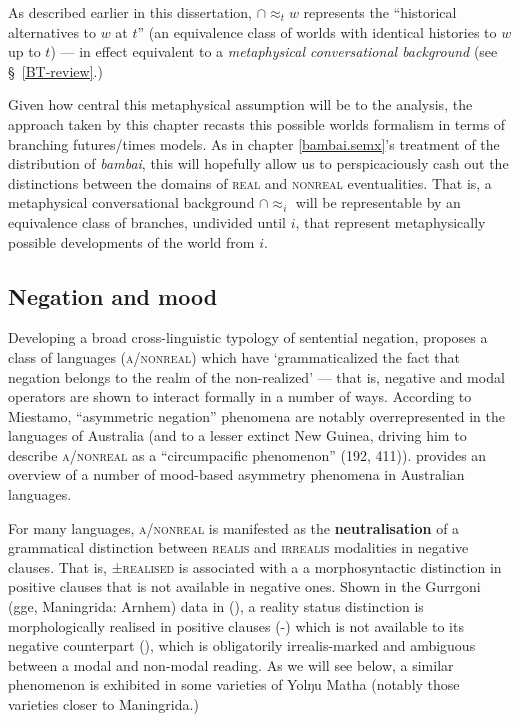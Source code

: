 \noindent As described earlier in this dissertation, $\cap\!\approx_t\!w $ represents the ``historical alternatives to $ w $ at $ t $'' (an equivalence class of worlds with identical histories to $ w $ up to $ t $) --- in effect equivalent to a \textit{metaphysical conversational background} (see \S~\ref{BT-review}.)


 Given how central this metaphysical assumption will be to the analysis, the approach taken by this chapter recasts this possible worlds formalism in terms of branching futures/times models. As in chapter \ref{bambai.semx}'s treatment of the distribution of \textit{bambai}, this will hopefully allow us to perspicaciously cash out the distinctions between the domains of \textsc{real} and \textsc{nonreal} eventualities. That is, a metaphysical conversational background $ \cap\!\approx_i $ will be representable by an equivalence class of branches, undivided until $ i $, that represent metaphysically possible developments of the world from $ i $.

\subsection{Negation and mood}\label{sec:asymneg}

Developing a broad cross-linguistic typology of sentential negation, \citet[208]{Miestamo2005} proposes a class of languages (\textsc{a/nonreal}) which have `grammaticalized the fact that negation belongs to the realm of the non-realized' --- that is, negative and modal operators are shown to interact formally in a number of ways. According to Miestamo, ``asymmetric negation'' phenomena are notably overrepresented in the languages of Australia (and to a lesser extinct New Guinea, driving him to describe \textsc{a/nonreal} as a ``circumpacific phenomenon'' (192, 411)). \citet[\S2.2]{Phillips2021b} provides an overview of a number of mood-based asymmetry phenomena in Australian languages.


For many languages, \textsc{a/nonreal} is manifested as the \textbf{neutralisation} of a grammatical distinction between \textsc{realis} and \textsc{irrealis} modalities in negative clauses. That is, ±\textsc{realised} is associated with a a morphosyntactic distinction in positive clauses that is not available in negative ones. Shown in the Gurrgoni (\gls{gge}, Maningrida: Arnhem) data in (), a reality status distinction is morphologically realised in positive clauses (-) which is not available to its negative counterpart (), which is obligatorily irrealis-marked and ambiguous between a modal and non-modal reading. As we will see below, a similar phenomenon is exhibited in some varieties of Yolŋu Matha (notably those varieties closer to Maningrida.)


